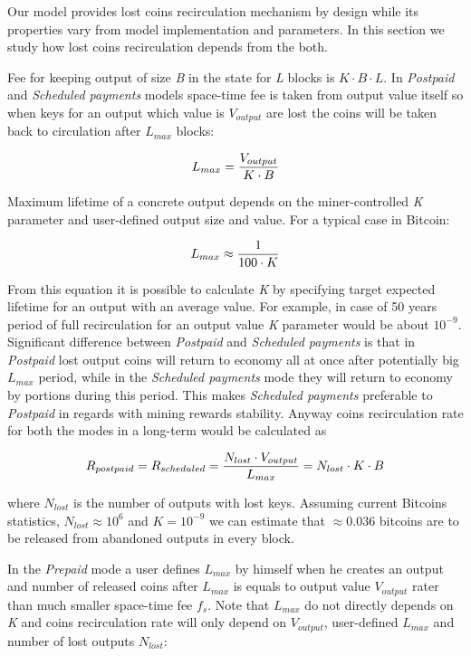 \documentclass[]{llncs}   %
\newcommand{\state}{state}
\begin{document}
Our model provides lost coins recirculation mechanism by design while its properties vary from model implementation and parameters. In this section we study how lost coins recirculation depends from the both.

Fee for keeping output of size \textit{B} in the \state{} for \textit{L} blocks is ${K \cdot B \cdot L}$. In \textit{Postpaid} and \textit{Scheduled payments} models space-time fee is taken from output value itself so when keys for an output which value is \textit{$V_{output}$} are lost the coins will be taken back to circulation after \textit{$L_{max}$} blocks: 

\begin{equation}
{L_{max} = {V_{output} \over K \cdot B}}
\end{equation}

Maximum lifetime of a concrete output depends on the miner-controlled \textit{K} parameter and user-defined output size and value. For a typical case in Bitcoin:

\begin{equation}
{L_{max} \approx {1 \over 100 \cdot K}}
\end{equation}

From this equation it is possible to calculate \textit{K} by specifying target expected lifetime for an output with an average value. For example, in case of 50 years period of full recirculation for an output value \textit{K} parameter would be about $10^{-9}$. Significant difference between \textit{Postpaid} and \textit{Scheduled payments} is that in \textit{Postpaid} lost output coins will return to economy all at once after potentially big $L_{max}$ period, while in the \textit{Scheduled payments} mode they will return to economy by portions during this period. This makes \textit{Scheduled payments} preferable to \textit{Postpaid} in regards with mining rewards stability. Anyway coins recirculation rate for both the modes in a long-term would be calculated as

\begin{equation}
R_{postpaid} = R_{scheduled} = {N_{lost} \cdot V_{output} \over L_{max}} = {N_{lost} \cdot K \cdot B}
\end{equation}

where $N_{lost}$ is the number of outputs with lost keys. Assuming current Bitcoins statistics, $N_{lost}\approx10^6$ and $K = 10^{-9}$ we can estimate that $\approx0.036$ bitcoins are to be released from abandoned outputs in every block.

In the \textit{Prepaid} mode a user defines $L_{max}$ by himself when he creates an output and number of released coins after $L_{max}$ is equals to output value $V_{output}$ rater than much smaller space-time fee $f_s$. Note that $L_{max}$ do not directly depends on \textit{K} and coins recirculation rate will only depend on $V_{output}$, user-defined $L_{max}$ and number of lost outputs $N_{lost}$:
\end{document}
